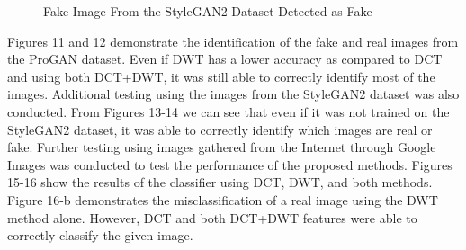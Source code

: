 \documentclass{icsthesis}
\begin{document}
\begin{mainmatter}
\begin{figure}
    \centering
    \hfil
    \hfil
    \caption{Fake Image From the StyleGAN2 Dataset Detected as Fake}
    \label{fig:mainfig}
\end{figure}



Figures 11 and 12 demonstrate the identification of the fake and real images from the ProGAN dataset. Even if DWT has a lower accuracy as compared to DCT and using both DCT+DWT, it was still able to correctly identify most of the images. Additional testing using the images from the StyleGAN2 dataset was also conducted. From Figures 13-14 we can see that even if it was not trained on the StyleGAN2 dataset, it was able to correctly identify which images are real or fake. Further testing using images gathered from the Internet through Google Images was conducted to test the performance of the proposed methods. Figures 15-16 show the results of the classifier using DCT, DWT, and both methods. Figure 16-b demonstrates the misclassification of a real image using the DWT method alone. However, DCT and both DCT+DWT features were able to correctly classify the given image.






\end{mainmatter}
\end{document}
